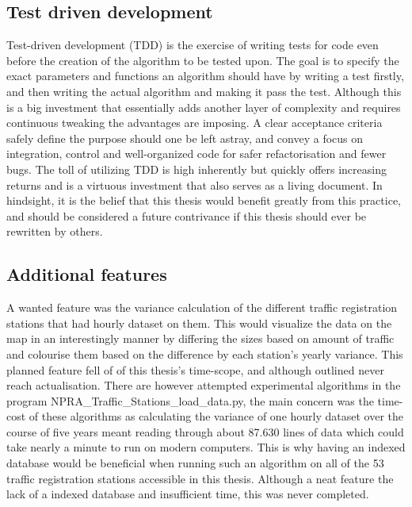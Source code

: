 \subsection{Test driven development}
Test-driven development (TDD) is the exercise of writing tests for code even before the creation of the algorithm to be tested upon. The goal is to specify the exact parameters and functions an algorithm should have by writing a test firstly, and then writing the actual algorithm and making it pass the test. Although this is a big investment that essentially adds another layer of complexity and requires continuous tweaking the advantages are imposing. A clear acceptance criteria safely define the purpose should one be left astray, and convey a focus on integration, control and well-organized code for safer refactorisation and fewer bugs. The toll of utilizing TDD is high inherently but quickly offers increasing returns and is a virtuous investment that also serves as a living document.
In hindsight, it is the belief that this thesis would benefit greatly from this practice, and should be considered a future contrivance if this thesis should ever be rewritten by others.

\subsection{Additional features}
A wanted feature was the variance calculation of the different traffic registration stations that had hourly dataset on them. This would visualize the data on the map in an interestingly manner by differing the sizes based on amount of traffic and colourise them based on the difference by each station's yearly variance. This planned feature fell of of this thesis's time-scope, and although outlined never reach actualisation. There are however attempted experimental algorithms in the program NPRA\_Traffic\_Stations\_load\_data.py, the main concern was the time-cost of these algorithms as calculating the variance of one hourly dataset over the course of five years meant reading through about 87.630 lines of data which could take nearly a minute to run on modern computers. This is why having an indexed database would be beneficial when running such an algorithm on all of the 53 traffic registration stations accessible in this thesis. Although a neat feature the lack of a indexed database and insufficient time, this was never completed.


